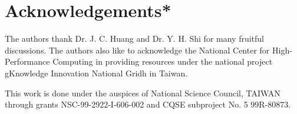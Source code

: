 \documentclass{rsproca}%
\begin{document}
\section{Acknowledgements*}
\label{Acknowledgements}
The authors thank Dr. J. C. Huang and Dr. Y. H. Shi for many fruitful discussions. The authors also like to acknowledge the National
Center for High-Performance Computing in providing resources
under the national project gKnowledge Innovation National Gridh in Taiwan.

This work is done under the auspices of National Science Council, TAIWAN through grants NSC-99-2922-I-606-002 and CQSE subproject No. 5 99R-80873.









\end{document}
